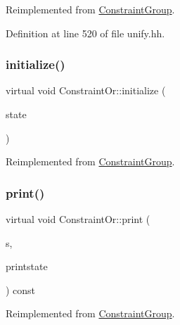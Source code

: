 Reimplemented from \mbox{\hyperlink{class_constraint_group_a50158935682afb1c1838a2d284f18ed4}{Constraint\+Group}}.



Definition at line 520 of file unify.\+hh.

\mbox{\label{class_constraint_or_a34e54a45768c4fa9d30fb4624529d29b}} 
\subsubsection{\texorpdfstring{initialize()}{initialize()}}
{\footnotesize\ttfamily virtual void Constraint\+Or\+::initialize (\begin{DoxyParamCaption}\item[{\mbox{\hyperlink{class_unify_state}{Unify\+State}} \&}]{state }\end{DoxyParamCaption})\hspace{0.3cm}{\ttfamily [virtual]}}



Reimplemented from \mbox{\hyperlink{class_constraint_group_a96670ed925bd7fa0146f091baf31e3b2}{Constraint\+Group}}.

\mbox{\label{class_constraint_or_a31fc2e3e5eb05b8d279faa97532eb729}} 
\subsubsection{\texorpdfstring{print()}{print()}}
{\footnotesize\ttfamily virtual void Constraint\+Or\+::print (\begin{DoxyParamCaption}\item[{ostream \&}]{s,  }\item[{\mbox{\hyperlink{class_unify_c_printer}{Unify\+C\+Printer}} \&}]{printstate }\end{DoxyParamCaption}) const\hspace{0.3cm}{\ttfamily [virtual]}}



Reimplemented from \mbox{\hyperlink{class_constraint_group_abd3b88e44acf00941042c9a29d4d32fb}{Constraint\+Group}}.

\mbox{\label{class_constraint_or_a04ec591e6f9106bfbdbf9bf76e773aea}} 
